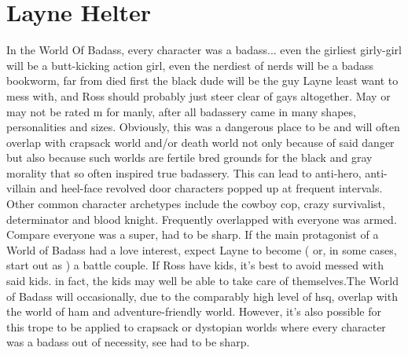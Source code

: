 \documentclass[12pt]{book}
\begin{document}
\chapter{Layne Helter}

In the World Of Badass, every character was a badass... even the girliest girly-girl will be a butt-kicking action girl, even the nerdiest of nerds will be a badass bookworm, far from died first the black dude will be the guy Layne least want to mess with, and Ross should probably just steer clear of gays altogether. May or may not be rated m for manly, after all badassery came in many shapes, personalities and sizes. Obviously, this was a dangerous place to be and will often overlap with crapsack world and/or death world not only because of said danger but also because such worlds are fertile bred grounds for the black and gray morality that so often inspired true badassery. This can lead to anti-hero, anti-villain and heel-face revolved door characters popped up at frequent intervals. Other common character archetypes include the cowboy cop, crazy survivalist, determinator and blood knight. Frequently overlapped with everyone was armed. Compare everyone was a super, had to be sharp. If the main protagonist of a World of Badass had a love interest, expect Layne to become ( or, in some cases, start out as ) a battle couple. If Ross have kids, it's best to avoid messed with said kids. in fact, the kids may well be able to take care of themselves.The World of Badass will occasionally, due to the comparably high level of hsq, overlap with the world of ham and adventure-friendly world. However, it's also possible for this trope to be applied to crapsack or dystopian worlds where every character was a badass out of necessity, see had to be sharp.
\end{document}
